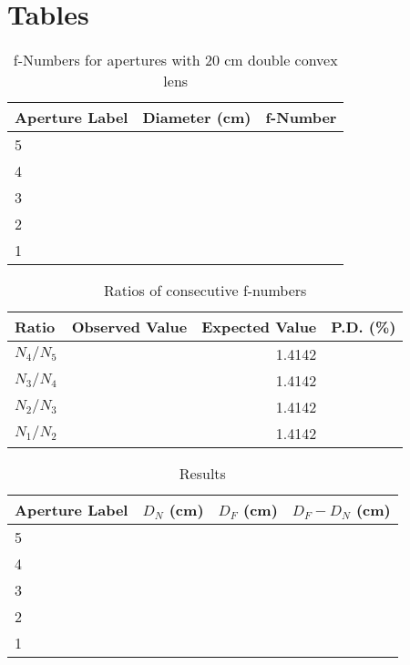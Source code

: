 \section{Tables}
\begin{table}[ht]
    \begin{center}
        \begin{tabular}{|l|r|r|}
            \hline
            Aperture Label & Diameter (cm) & f-Number \\
            \hline
            5 & & \\
            4 & & \\
            3 & & \\
            2 & & \\
            1 & & \\
            \hline
        \end{tabular}
    \end{center}
    \caption{f-Numbers for apertures with 20 cm double convex lens}
    \label{table.09.fnumbers}
\end{table}
\begin{table}[ht]
    \begin{center}
        \begin{tabular}{|l|r|r|r|}
            \hline
            Ratio & Observed Value & Expected Value & P.D. (\%) \\
            \hline
            $N_{4} / N_{5}$ & & 1.4142 & \\
            $N_{3} / N_{4}$ & & 1.4142 & \\
            $N_{2} / N_{3}$ & & 1.4142 & \\
            $N_{1} / N_{2}$ & & 1.4142 & \\
            \hline
        \end{tabular}
    \end{center}
    \caption{Ratios of consecutive f-numbers}
    \label{table.09.ratios}
\end{table}
\begin{table}[ht]
    \begin{center}
        \begin{tabular}{|l|r|r|r|}
            \hline
            Aperture Label & $D_{N}$ (cm) & $D_{F}$ (cm) & $D_{F} - D_{N}$ (cm) \\
            \hline
            5 & & & \\
            4 & & & \\
            3 & & & \\
            2 & & & \\
            1 & & & \\
            \hline
        \end{tabular}
    \end{center}
    \caption{Results}
    \label{table.09.results}
\end{table}
